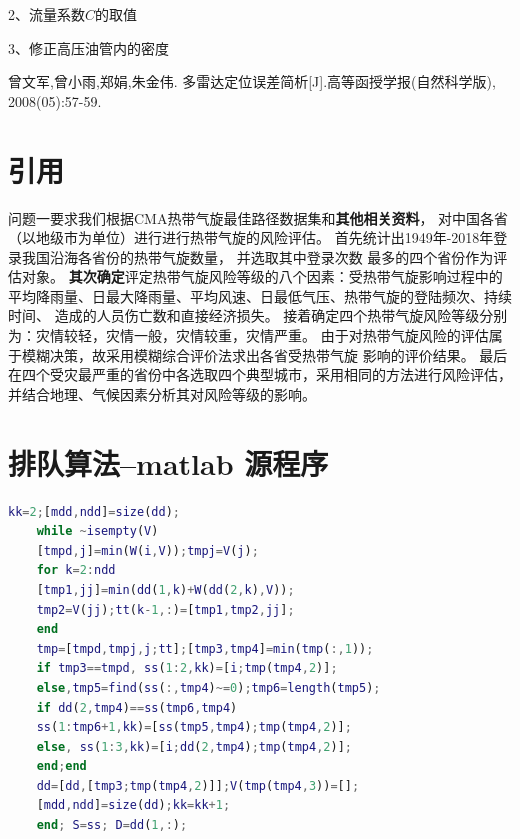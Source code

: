 \documentclass[withoutpreface,bwprint]{cumcmthesis} %
\begin{document}
2、流量系数$C$的取值

3、修正高压油管内的密度
   

\begin{thebibliography}{9}%
曾文军,曾小雨,郑娟,朱金伟.
    多雷达定位误差简析[J].高等函授学报(自然科学版),
    2008(05):57-59.

\end{thebibliography}


\newpage
\begin{appendices}
\section{引用}
  问题一要求我们根据CMA热带气旋最佳路径数据集和{\bfseries\heiti 其他相关资料}，
对中国各省（以地级市为单位）{\cu 进行}进行热带气旋的风险评估。
首先统计出1949年-2018年登录我国沿海各省份的热带气旋数量，
并选取其中登录次数 最多的四个省份作为评估对象。
{\bfseries 其次确定}评定热带气旋风险等级的八个因素：{\cu 受热带气旋}影响过程中的
平均降雨量、{\chu 日最大}降雨量、平均风速、日最低气压、热带气旋的登陆频次、持续时间、
造成的人员伤亡数和直接经济损失。
接着确定四个热带气旋风险等级分别为：灾情较轻，灾情一般，灾情较重，灾情严重。
由于对热带气旋风险的评估属于模糊决策，故采用模糊综合评价法求出各省受热带气旋
影响的评价结果。\cite{bib:one}
最后在四个受灾最严重的省份中各选取四个典型城市，采用相同的方法进行风险评估，
并结合地理、气候因素分析其对风险等级的影响。

\section{排队算法--matlab 源程序}
    \begin{lstlisting}[language=matlab]
    kk=2;[mdd,ndd]=size(dd);
    while ~isempty(V)
    [tmpd,j]=min(W(i,V));tmpj=V(j);
    for k=2:ndd
    [tmp1,jj]=min(dd(1,k)+W(dd(2,k),V));
    tmp2=V(jj);tt(k-1,:)=[tmp1,tmp2,jj];
    end
    tmp=[tmpd,tmpj,j;tt];[tmp3,tmp4]=min(tmp(:,1));
    if tmp3==tmpd, ss(1:2,kk)=[i;tmp(tmp4,2)];
    else,tmp5=find(ss(:,tmp4)~=0);tmp6=length(tmp5);
    if dd(2,tmp4)==ss(tmp6,tmp4)
    ss(1:tmp6+1,kk)=[ss(tmp5,tmp4);tmp(tmp4,2)];
    else, ss(1:3,kk)=[i;dd(2,tmp4);tmp(tmp4,2)];
    end;end
    dd=[dd,[tmp3;tmp(tmp4,2)]];V(tmp(tmp4,3))=[];
    [mdd,ndd]=size(dd);kk=kk+1;
    end; S=ss; D=dd(1,:);
    \end{lstlisting}


\end{appendices}
\end{document}
